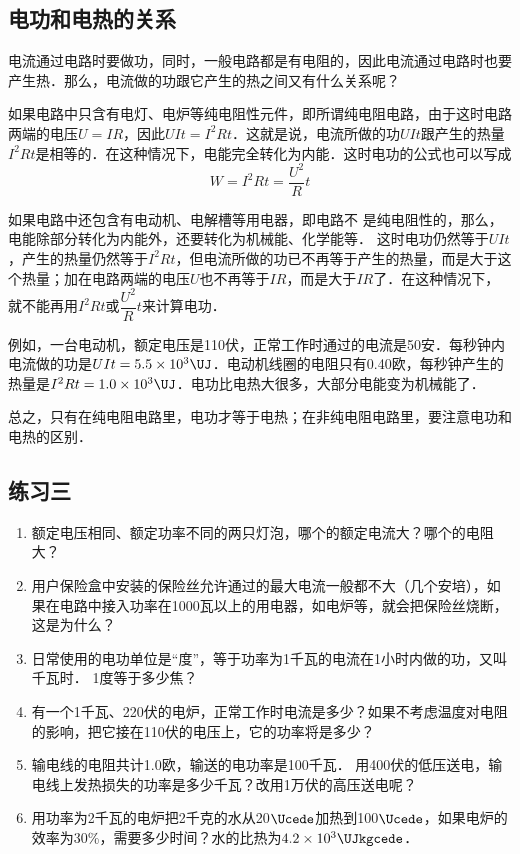 \subsection{电功和电热的关系} 

电流通过电路时要做功，同时，一般电路都是有电阻的，因此电流通过电路时也要产生热．那么，电流做的功跟它产生的热之间又有什么关系呢？

如果电路中只含有电灯、电炉等纯电阻性元件，即所谓纯电阻电路，由于这时电路两端的电压$U=IR$，因此$UIt=I^2Rt$．这就是说，电流所做的功$UIt$跟产生的热量$I^2Rt$是相等的．在这种情况下，电能完全转化为内能．这时电功的公式也可以写成
\[W=I^2Rt=\frac{U^2}{R}t\]

如果电路中还包含有电动机、电解槽等用电器，即电路不
是纯电阻性的，那么，电能除部分转化为内能外，还要转化为机械能、化学能等．
这时电功仍然等于$UIt$，产生的热量仍然等于$I^2Rt$，但电流所做的功已不再等于产生的热量，而是大于这个热量；加在电路两端的电压$U$也不再等于$IR$，而是大于$IR$了．在这种情况下，就不能再用$I^2Rt$或$\dfrac{U^2}{R}t$来计算电功．

例如，一台电动机，额定电压是110伏，正常工作时通过的电流是50安．每秒钟内电流做的功是$UIt=5.5\times10^3\UJ $．电动机线圈的电阻只有0.40欧，每秒钟产生的热量是$I^2Rt=1.0\times10^3 \UJ $．电功比电热大很多，大部分电能变为机械能了．

总之，只有在纯电阻电路里，电功才等于电热；在非纯电阻电路里，要注意电功和电热的区别．

\subsection*{练习三}
\begin{enumerate}
    \item 额定电压相同、额定功率不同的两只灯泡，哪个的额定电流大？哪个的电阻大？
    \item 用户保险盒中安装的保险丝允许通过的最大电流一般都不大（几个安培），如果在电路中接入功率在1000瓦以上的用电器，如电炉等，就会把保险丝烧断，这是为什么？
    \item 日常使用的电功单位是“度”，等于功率为1千瓦的电流在1小时内做的功，又叫千瓦时．
    1度等于多少焦？
    \item 有一个1千瓦、220伏的电炉，正常工作时电流是多少？如果不考虑温度对电阻的影响，把它接在110伏的电压上，它的功率将是多少？
    \item 输电线的电阻共计1.0欧，输送的电功率是100千瓦．
    用400伏的低压送电，输电线上发热损失的功率是多少千瓦？改用1万伏的高压送电呢？
    \item 用功率为2千瓦的电炉把2千克的水从20$\Ucede$加热到100$\Ucede$，如果电炉的效率为30\%，需要多少时间？水的比热为$4.2\times10^3 \UJkgcede$．
\end{enumerate}


